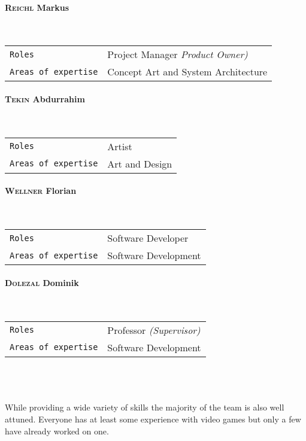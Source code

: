 \documentclass[11pt]{article}
\begin{document}
\paragraph{\textsc{Reichl} Markus} ~\\
\begin{tabular}{ll}
\texttt{Roles} & Project Manager \textit{\small{Product Owner)}}\\
\texttt{Areas of expertise} & Concept Art and System Architecture
\end{tabular}
\paragraph{\textsc{Tekin} Abdurrahim} ~\\
\begin{tabular}{ll}
\texttt{Roles} & Artist\\
\texttt{Areas of expertise} & Art and Design
\end{tabular}
\paragraph{\textsc{Wellner} Florian} ~\\
\begin{tabular}{ll}
\texttt{Roles} & Software Developer\\
\texttt{Areas of expertise} & Software Development
\end{tabular}
\paragraph{\textsc{Dolezal} Dominik} ~\\
\begin{tabular}{ll}
\texttt{Roles} & Professor \textit{\small{(Supervisor)}}\\
\texttt{Areas of expertise} & Software Development
\end{tabular}
\\
\\
\\
While providing a wide variety of skills the majority of the team is also well attuned. Everyone has at least some experience with video games but only a few have already worked on one.
\end{document}
